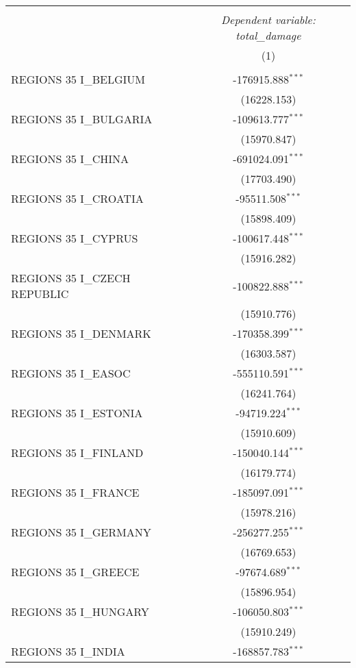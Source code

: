 \begin{table}[!htbp] \centering
\begin{tabular}{@{\extracolsep{5pt}}lc}
\\[-1.8ex]\hline
\hline \\[-1.8ex]
& \multicolumn{1}{c}{\textit{Dependent variable: total\_damage}} \
\cr \cline{2-2}
\\[-1.8ex] & (1) \\
\hline \\[-1.8ex]
 REGIONS 35 I\_BELGIUM & -176915.888$^{***}$ \\
& (16228.153) \\
 REGIONS 35 I\_BULGARIA & -109613.777$^{***}$ \\
& (15970.847) \\
 REGIONS 35 I\_CHINA & -691024.091$^{***}$ \\
& (17703.490) \\
 REGIONS 35 I\_CROATIA & -95511.508$^{***}$ \\
& (15898.409) \\
 REGIONS 35 I\_CYPRUS & -100617.448$^{***}$ \\
& (15916.282) \\
 REGIONS 35 I\_CZECH REPUBLIC & -100822.888$^{***}$ \\
& (15910.776) \\
 REGIONS 35 I\_DENMARK & -170358.399$^{***}$ \\
& (16303.587) \\
 REGIONS 35 I\_EASOC & -555110.591$^{***}$ \\
& (16241.764) \\
 REGIONS 35 I\_ESTONIA & -94719.224$^{***}$ \\
& (15910.609) \\
 REGIONS 35 I\_FINLAND & -150040.144$^{***}$ \\
& (16179.774) \\
 REGIONS 35 I\_FRANCE & -185097.091$^{***}$ \\
& (15978.216) \\
 REGIONS 35 I\_GERMANY & -256277.255$^{***}$ \\
& (16769.653) \\
 REGIONS 35 I\_GREECE & -97674.689$^{***}$ \\
& (15896.954) \\
 REGIONS 35 I\_HUNGARY & -106050.803$^{***}$ \\
& (15910.249) \\
 REGIONS 35 I\_INDIA & -168857.783$^{***}$ \\

\end{tabular}
\end{table}
